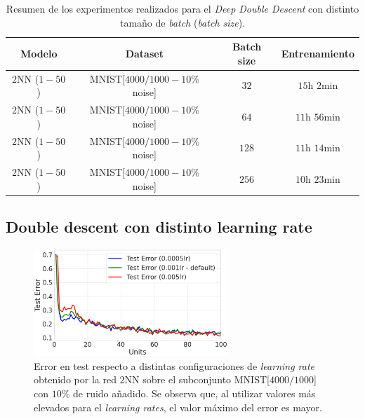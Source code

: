 \begin{table}[h!]
    \centering
    \begin{tabular}{|c|c|c|c|}
    \hline
    \textbf{Modelo}       & \textbf{Dataset} & \textbf{Batch size} & \textbf{Entrenamiento} \\ 
    \hline
    $2$NN ($1-50$)     & MNIST[$4000/1000 - 10$\% noise]      & $32$      & $15$h $2$min         \\ 
    $2$NN ($1-50$)     & MNIST[$4000/1000 - 10$\% noise]      & $64$      & $11$h $56$min         \\ 
    $2$NN ($1-50$)     & MNIST[$4000/1000 - 10$\% noise]      & $128$      & $11$h $14$min         \\ 
    $2$NN ($1-50$)     & MNIST[$4000/1000 - 10$\% noise]      & $256$      & $10$h $23$min         \\
    \hline
    \end{tabular}
    \caption[Resumen de los experimentos realizados para el \textit{Deep Double Descent} con distinto tamaño de \textit{batch}.]{Resumen de los experimentos realizados para el \textit{Deep Double Descent} con distinto tamaño de \textit{batch} (\textit{batch size}).}\label{tab:dddbatchsizes}
\end{table}

\subsection*{Double descent con distinto learning rate}

\begin{figure}[h!]
    \centering
    \includegraphics[width=0.65\textwidth]{img/experiments/learning_rates_ddd.png}
    \caption[\textit{Deep Double Descent} para distinto \textit{learning rate}.]{Error en test respecto a distintas configuraciones de \textit{learning rate} obtenido por la red $2$NN sobre el subconjunto MNIST[$4000/1000$] con $10$\% de ruido añadido. Se observa que, al utilizar valores más elevados para el \textit{learning rates}, el valor máximo del error es mayor.}\label{fig:difflr}
\end{figure}

